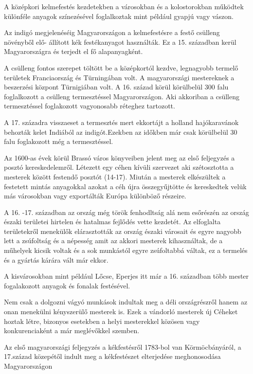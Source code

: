 \documentclass[fontsize=12pt, appendixprefix=true]{scrreprt}
\begin{document}
A középkori kelmefestés kezdetekben a városokban és a kolostorokban működtek különféle anyagok színezésével foglalkoztak mint például gyapjú vagy vászon. 

Az indigó megjelenéséig Magyarországon a kelmefestésre a festő csülleng növényből elő- állított kék festékanyagot használták. Ez a 15. században  kerül Magyarországra és terjedt el fő alapanyagként.

A csülleng fontos szerepet töltött be a középkortól kezdve, legnagyobb termelő területek Franciaország és Türningában volt. A magyarországi mestereknek a beszerzési központ Türnigiában volt.
A 16. század körül körülbelül 300 falu foglalkozott a csülleng termesztéssel Magyarországon. Aki akkoriban a csülleng termesztéssel foglakozott vagyonosabb réteghez tartozott. 

A 17. századra visszaeset  a termesztés mert ekkortájt a holland hajókaravánok behozták kelet Indiából az indigót.Ezekben az időkben már csak körülbelül 30 falu foglakozott még a termesztéssel.

Az 1600-as évek körül Brassó város könyveiben jelent meg az első feljegyzés a posztó kereskedelemről.
Létezett egy céhen kívüli szervezet aki szétosztotta  a mesterek között festendő posztót \cite{domonkos1981magyarorszagi}(14-17). 
Miután a mesterek elkészültek a festetett mintás anyagokkal azokat a céh újra összegyűjtötte és kereskedtek  velük más városokban vagy exportálták Európa különböző részeire.

A 16. -17. században az ország még török fenhodltság alá nem esőrészén az ország északi területei hirtelen és hatalmas fejlődés vette kezdetét.
Az elfoglalta területekről menekülők elárasztották az ország északi városait és egyre nagyobb lett a zsúfoltság és a népesség amit az akkori mesterek kihasználtak, de a műhelyek kicsik voltak és a sok munkástól egyre zsúfoltabbá váltak, ez a termelés és a gyártás kárára vált már ekkor.

A kisvárosokban mint például Lőcse, Eperjes itt már a 16. században több mester  fogalakozott anyagok és fonalak  festésével. 

Nem csak a dolgozni vágyó munkások indultak meg a déli országrészről hanem az onan menekülni kényszerülő mesterek is. Ezek a vándorló mesterek új Céheket hoztak létre, bizonyos esetekben a helyi mesterekkel közösen vagy konkurenciaként a már meglévőkkel szemben. 

Az első magyarországi feljegyzés a kékfestésről 1783-bol van Körmöcbányáról, a 17.század közepétől indult meg a kékfestészet elterjedése meghonosodása Magyarországon  %
\end{document}
